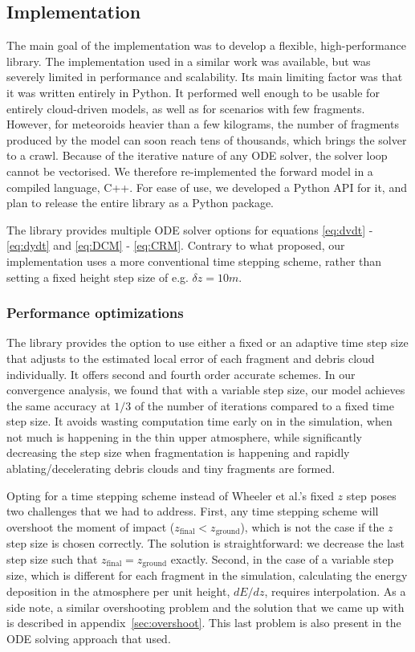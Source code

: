 \subsection{Implementation}
\label{sec:implementation}
The main goal of the implementation was to develop a flexible, high-performance library. The implementation used in a similar work \citep{newland2019CFM18} was available, but was severely limited in performance and scalability. Its main limiting factor was that it was written entirely in Python. It performed well enough to be usable for entirely cloud-driven models, as well as for scenarios with few fragments. However, for meteoroids heavier than a few kilograms, the number of fragments produced by the model can soon reach tens of thousands, which brings the solver to a crawl. Because of the iterative nature of any ODE solver, the solver loop cannot be vectorised.
We therefore re-implemented the forward model in a compiled language, C++.
For ease of use, we developed a Python API for it, and plan to release the entire library as a Python package.

The library provides multiple ODE solver options for equations \ref{eq:dvdt} - \ref{eq:dydt} and \ref{eq:DCM} - \ref{eq:CRM}.
Contrary to what \cite{wheeler2017fragmentcloud} proposed, our implementation uses a more conventional time stepping scheme, rather than setting a fixed height step size of e.g. $\delta z = 10\unit{m}$.

\subsubsection{Performance optimizations}
The library provides the option to use either a fixed or an adaptive time step size that adjusts to the estimated local error of each fragment and debris cloud individually. It offers second and fourth order accurate schemes. In our convergence analysis, we found that with a variable step size, our model achieves the same accuracy at $1/3$ of the number of iterations compared to a fixed time step size. It avoids wasting computation time early on in the simulation, when not much is happening in the thin upper atmosphere, while significantly decreasing the step size when fragmentation is happening and rapidly ablating/decelerating debris clouds and tiny fragments are formed.

Opting for a time stepping scheme instead of Wheeler et al.'s fixed $z$ step poses two challenges that we had to address. First, any time stepping scheme will overshoot the moment of impact ($z_\mathrm{final} < z_\mathrm{ground}$), which is not the case if the $z$ step size is chosen correctly. The solution is straightforward: we decrease the last step size such that $z_\mathrm{final} = z_\mathrm{ground}$ exactly. Second, in the case of a variable step size, which is different for each fragment in the simulation, calculating the energy deposition in the atmosphere per unit height, $dE/dz$, requires interpolation. As a side note, a similar overshooting problem and the solution that we came up with is described in appendix~\ref{sec:overshoot}. This last problem is also present in the ODE solving approach that \cite{wheeler2017fragmentcloud} used.

